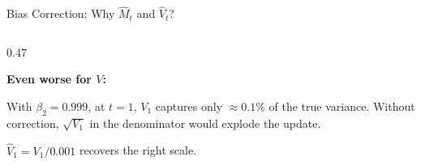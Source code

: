 \begin{frame}{Bias Correction: Why $\hat{M}_t$ and $\hat{V}_t$?}
\begin{columns}[T]
\begin{column}{0.47\textwidth}
\begin{center}

      \vspace{0.4em}
      \textbf{Even worse for $V$:}

      \vspace{0.2em}
      With $\beta_2 = 0.999$, at $t=1$, $V_1$ captures only $\approx 0.1\%$ of the true variance. Without correction, $\sqrt{V_1}$ in the denominator would explode the update.

      \vspace{0.2em}
      $\hat{V}_1 = V_1 / 0.001$ recovers the right scale.
      \end{center}
    \end{column}
  \end{columns}

\end{frame}

